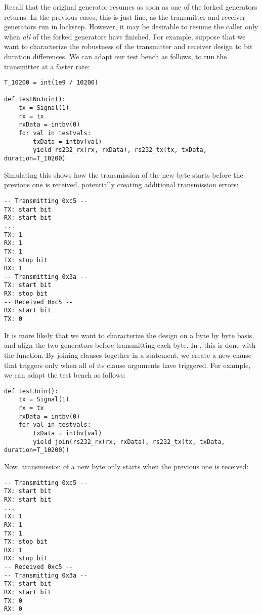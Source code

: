 Recall that the original generator resumes as soon as one of the
forked generators returns. In the previous cases, this is just fine,
as the transmitter and receiver generators run in lockstep. However,
it may be desirable to resume the caller only when \emph{all} of the
forked generators have finished. For example, suppose that we want to
characterize the robustness of the transmitter and receiver design to
bit duration differences. We can adapt our test bench as follows, to
run the transmitter at a faster rate:

\begin{verbatim}
T_10200 = int(1e9 / 10200)

def testNoJoin():
    tx = Signal(1)
    rx = tx
    rxData = intbv(0)
    for val in testvals:
        txData = intbv(val)
        yield rs232_rx(rx, rxData), rs232_tx(tx, txData, duration=T_10200)
\end{verbatim}

Simulating this shows how the transmission of the new byte starts
before the previous one is received, potentially creating additional
transmission errors:

\begin{verbatim}
-- Transmitting 0xc5 --
TX: start bit
RX: start bit
...
TX: 1
RX: 1
TX: 1
TX: stop bit
RX: 1
-- Transmitting 0x3a --
TX: start bit
RX: stop bit
-- Received 0xc5 --
RX: start bit
TX: 0
\end{verbatim}

It is more likely that we want to characterize the design on a byte
by byte basis, and align the two generators before transmitting each
byte. In \myhdl{}, this is done with the  function. By
joining clauses together in a  statement, we create a new
clause that triggers only when all of its clause arguments have
triggered. For example, we can adapt the test bench as follows:

\begin{verbatim}
def testJoin():
    tx = Signal(1)
    rx = tx
    rxData = intbv(0)
    for val in testvals:
        txData = intbv(val)
        yield join(rs232_rx(rx, rxData), rs232_tx(tx, txData, duration=T_10200))
\end{verbatim}

Now, transmission of a new byte only starts when the previous one is received:

\begin{verbatim}
-- Transmitting 0xc5 --
TX: start bit
RX: start bit
...
TX: 1
RX: 1
TX: 1
TX: stop bit
RX: 1
RX: stop bit
-- Received 0xc5 --
-- Transmitting 0x3a --
TX: start bit
RX: start bit
TX: 0
RX: 0
\end{verbatim}

